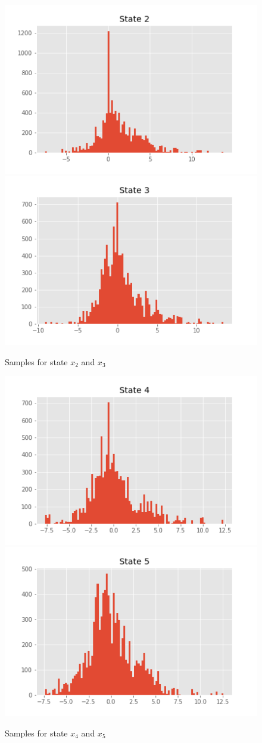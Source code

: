 \documentclass[]{article}
\begin{document}
\begin{figure}[H]
	\begin{center}
		
		\includegraphics[width=.4\textwidth]{task2/figures/T_2_2/Q2/plt_x2.png}
		\includegraphics[width=.4\textwidth]{task2/figures/T_2_2/Q2/plt_x3.png}
		
		\caption*{Samples for state $x_2$ and $x_3$}
		\end{center}
\end{figure}
\begin{figure}[H]
	\begin{center}
	
		\includegraphics[width=.4\textwidth]{task2/figures/T_2_2/Q2/plt_x4.png}
		\includegraphics[width=.4\textwidth]{task2/figures/T_2_2/Q2/plt_x5.png}
		
		\caption*{Samples for state $x_4$ and $x_5$}
		\end{center}
\end{figure}
\end{document}
